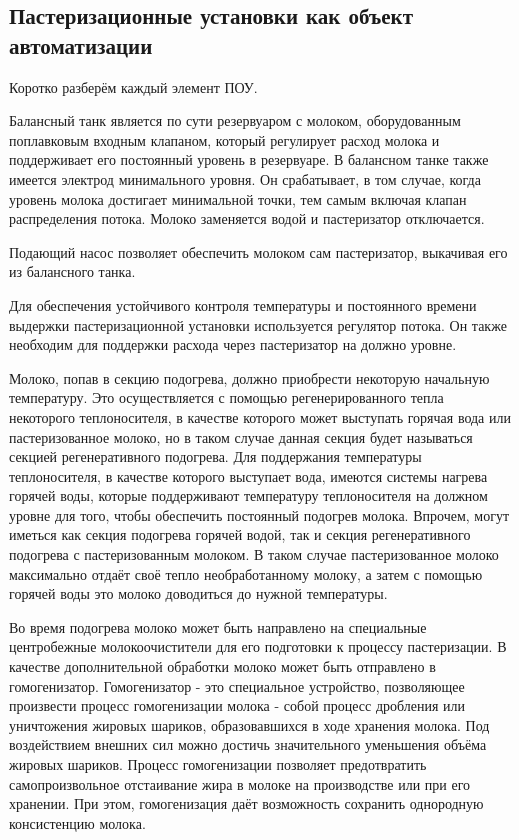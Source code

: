 \subsection{Пастеризационные установки как объект автоматизации}

Коротко разберём каждый элемент ПОУ.

Балансный танк является по сути резервуаром с молоком, оборудованным поплавковым входным клапаном, который регулирует расход молока и поддерживает его постоянный уровень в резервуаре. В балансном танке также имеется электрод минимального уровня. Он срабатывает, в том случае, когда уровень молока достигает минимальной точки, тем самым включая клапан распределения потока. Молоко заменяется водой и пастеризатор отключается.

Подающий насос позволяет обеспечить молоком сам пастеризатор, выкачивая его из балансного танка.

Для обеспечения устойчивого контроля температуры и постоянного времени выдержки пастеризационной установки используется регулятор потока. Он также необходим для поддержки расхода через пастеризатор на должно уровне.

Молоко, попав в секцию подогрева, должно приобрести некоторую начальную температуру. Это осуществляется с помощью регенерированного тепла некоторого теплоносителя, в качестве которого может выступать горячая вода или пастеризованное молоко, но в таком случае данная секция будет называться секцией регенеративного подогрева. Для поддержания температуры теплоносителя, в качестве которого выступает вода, имеются системы нагрева горячей воды, которые поддерживают температуру теплоносителя на должном уровне для того, чтобы обеспечить постоянный подогрев молока. Впрочем, могут иметься как секция подогрева горячей водой, так и секция регенеративного подогрева с пастеризованным молоком. В таком случае пастеризованное молоко максимально отдаёт своё тепло необработанному молоку, а затем с помощью горячей воды это молоко доводиться до нужной температуры.

Во время подогрева молоко может быть направлено на специальные центробежные молокоочистители для его подготовки к процессу пастеризации. В качестве дополнительной обработки молоко может быть отправлено в гомогенизатор. Гомогенизатор - это специальное устройство, позволяющее произвести процесс гомогенизации молока - собой процесс дробления или уничтожения жировых шариков, образовавшихся в ходе хранения молока. Под воздействием внешних сил можно достичь значительного уменьшения объёма жировых шариков. Процесс гомогенизации позволяет предотвратить самопроизвольное отстаивание жира в молоке на производстве или при его хранении. При этом, гомогенизация даёт возможность сохранить однородную консистенцию молока.

